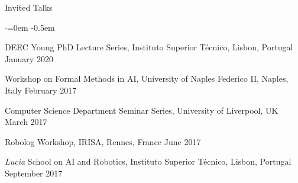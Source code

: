 
\begin{rSection}{Invited Talks}
 \begin{list}{$\cdot$}{\leftmargin=0em} %
   \itemsep -0.5em \vspace{-0.5em} %
   \item DEEC Young PhD   Lecture Series, Instituto Superior T\'{e}cnico, Lisbon, Portugal \hfill January 2020
  \item Workshop on Formal Methods in AI, University of Naples Federico II, Naples, Italy \hfill February 2017 
\item Computer Science Department Seminar Series, University of Liverpool, UK \hfill March 2017
\item  Robolog Workshop, IRISA, Rennes, France \hfill June 2017
\item  \emph{Lucia}  School on AI and Robotics, Instituto Superior T\'{e}cnico, Lisbon, Portugal \hfill September 2017
  \end{list}


\end{rSection}
